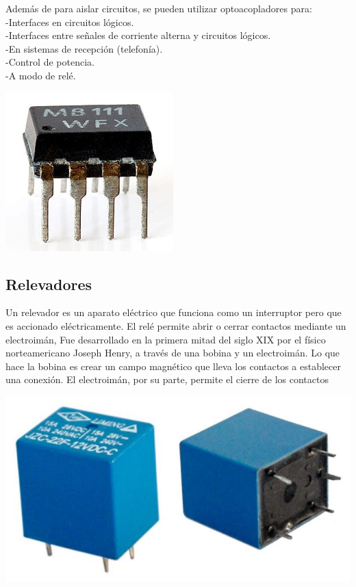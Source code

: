 \documentclass[12pt,a4paper]{article}
\begin{document}
Además de para aislar circuitos, se pueden utilizar optoacopladores para:\\
-Interfaces en circuitos lógicos.\\
-Interfaces entre señales de corriente alterna y circuitos lógicos.\\
-En sistemas de recepción (telefonía).\\
-Control de potencia.\\
-A modo de relé.\\
\begin{center}
\includegraphics[scale=1]{imagenes/opto.jpg}  
\newpage
\subsection{Relevadores}
\end{center}
\begin{flushleft}
Un relevador es un aparato eléctrico que funciona como un interruptor pero que es accionado eléctricamente. El relé permite abrir o cerrar contactos mediante un electroimán, Fue desarrollado en la primera mitad del siglo XIX por el físico norteamericano Joseph Henry, a través de una bobina y un electroimán.
Lo que hace la bobina es crear un campo magnético que lleva los contactos a establecer una conexión. El electroimán, por su parte, permite el cierre de los contactos
\end{flushleft}
\begin{center}
\includegraphics[scale=1]{imagenes/rele.JPG} 
\end{center}
\end{document}

